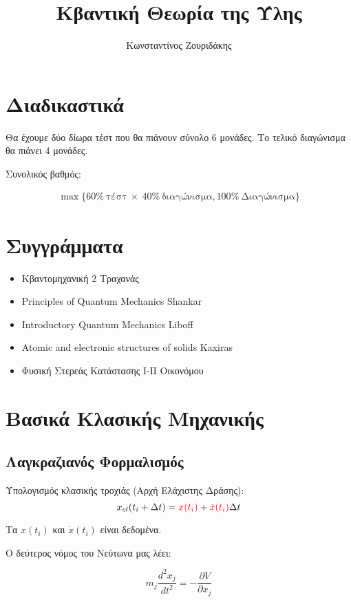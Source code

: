 \documentclass[11pt, oneside]{article}   	%
\title{Κβαντική Θεωρία της Ύλης}
\author{Κωνσταντίνος Ζουριδάκης}
\date{}							%
\begin{document}
\maketitle

\tableofcontents
\newpage

\section{Διαδικαστικά}

Θα έχουμε δύο δίωρα τέστ που θα πιάνουν σύνολο 6 μονάδες.
Το τελικό διαγώνισμα θα πιάνει 4 μονάδες.

Συνολικός βαθμός:

\begin{align*}
	\max\{60\% \ \text{τέστ} \ \times \ 40\% \ \text{διαγώνισμα}, 100\% \ \text{Διαγώνισμα}\}
\end{align*}

\section{Συγγράμματα}

\begin{itemize}
	\item Κβαντομηχανική 2 Τραχανάς 
	\item Principles of Quantum Mechanics Shankar
	\item Introductory Quantum Mechanics Liboff
	\item Atomic and electronic structures of solids Kaxiras
	\item Φυσική Στερεάς Κατάστασης Ι-ΙΙ Οικονόμου
\end{itemize}

\section{Βασικά Κλασικής Μηχανικής}

\subsection{Λαγκραζιανός Φορμαλισμός}

Υπολογισμός κλασικής τροχιάς (Αρχή Ελάχιστης Δράσης): \[x_{cl}(t_i + \Delta t)=\textcolor{red}{x(t_i)} + \textcolor{red}{\dot{x}(t_i)}\Delta t\]

Τα $x(t_i)$ και $\dot{x}(t_i)$ είναι δεδομένα.

Ο δεύτερος νόμος του Νεύτωνα μας λέει:

\[m_j \frac{d^2 x_j}{dt^2}=-\frac{\partial V}{\partial x_j}\]
\end{document}
